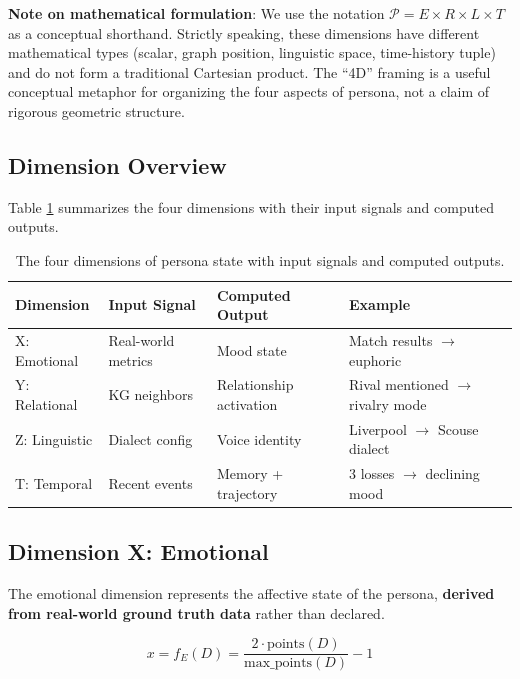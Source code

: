 \documentclass[11pt]{article}
\begin{document}
\textbf{Note on mathematical formulation}: We use the notation $\mathcal{P} = E \times R \times L \times T$ as a conceptual shorthand. Strictly speaking, these dimensions have different mathematical types (scalar, graph position, linguistic space, time-history tuple) and do not form a traditional Cartesian product. The ``4D'' framing is a useful conceptual metaphor for organizing the four aspects of persona, not a claim of rigorous geometric structure.

\subsection{Dimension Overview}

Table \ref{tab:dimensions} summarizes the four dimensions with their input signals and computed outputs.

\begin{table}[h]
\centering
\begin{tabular}{llll}
\toprule
\textbf{Dimension} & \textbf{Input Signal} & \textbf{Computed Output} & \textbf{Example} \\
\midrule
X: Emotional & Real-world metrics & Mood state & Match results $\rightarrow$ euphoric \\
Y: Relational & KG neighbors & Relationship activation & Rival mentioned $\rightarrow$ rivalry mode \\
Z: Linguistic & Dialect config & Voice identity & Liverpool $\rightarrow$ Scouse dialect \\
T: Temporal & Recent events & Memory + trajectory & 3 losses $\rightarrow$ declining mood \\
\bottomrule
\end{tabular}
\caption{The four dimensions of persona state with input signals and computed outputs.}
\label{tab:dimensions}
\end{table}

\subsection{Dimension X: Emotional}

The emotional dimension represents the affective state of the persona, \textbf{derived from real-world ground truth data} rather than declared.

\begin{equation}
x = f_E(D) = \frac{2 \cdot \text{points}(D)}{\text{max\_points}(D)} - 1
\end{equation}
\end{document}
